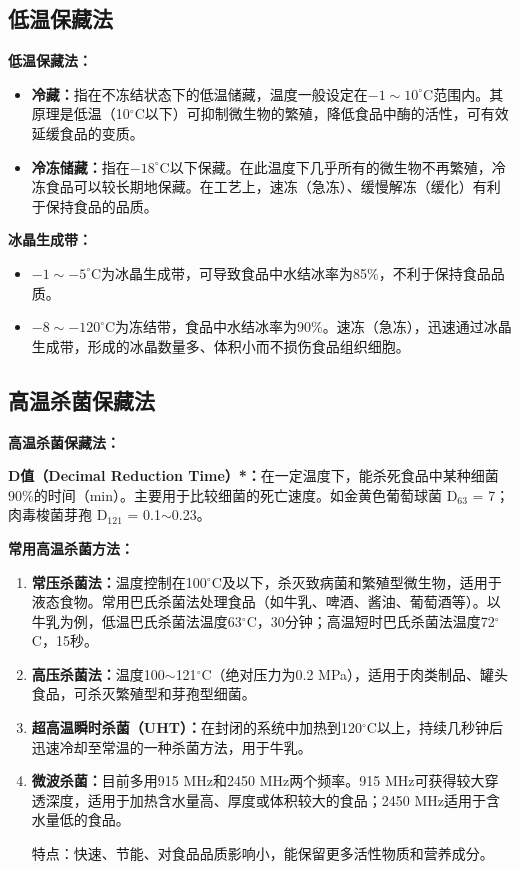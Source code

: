 \subsection{低温保藏法}

\begin{keybox}
\textbf{低温保藏法：}
\begin{itemize}[leftmargin=*]
    \item \textbf{冷藏：}指在不冻结状态下的低温储藏，温度一般设定在$-1\sim10^\circ$C范围内。其原理是低温（10$^\circ$C以下）可抑制微生物的繁殖，降低食品中酶的活性，可有效延缓食品的变质。
    \item \textbf{冷冻储藏：}指在$-18^\circ$C以下保藏。在此温度下几乎所有的微生物不再繁殖，冷冻食品可以较长期地保藏。在工艺上，速冻（急冻）、缓慢解冻（缓化）有利于保持食品的品质。
\end{itemize}

\textbf{冰晶生成带：}
\begin{itemize}[leftmargin=*]
    \item $-1\sim-5^\circ$C为冰晶生成带，可导致食品中水结冰率为85\%，不利于保持食品品质。
    \item $-8\sim-120^\circ$C为冻结带，食品中水结冰率为90\%。速冻（急冻），迅速通过冰晶生成带，形成的冰晶数量多、体积小而不损伤食品组织细胞。
\end{itemize}
\end{keybox}

\subsection{高温杀菌保藏法}

\begin{keybox}
\textbf{高温杀菌保藏法：}

\textbf{D值（Decimal Reduction Time）*\difficulty：}在一定温度下，能杀死食品中某种细菌90\%的时间（min）。主要用于比较细菌的死亡速度。如金黄色葡萄球菌 D$_{63}$ = 7；肉毒梭菌芽孢 D$_{121}$ = 0.1$\sim$0.23。

\textbf{常用高温杀菌方法：}
\begin{enumerate}[leftmargin=*]
    \item \textbf{常压杀菌法：}温度控制在100$^\circ$C及以下，杀灭致病菌和繁殖型微生物，适用于液态食物。常用巴氏杀菌法处理食品（如牛乳、啤酒、酱油、葡萄酒等）。以牛乳为例，低温巴氏杀菌法温度63$^\circ$C，30分钟；高温短时巴氏杀菌法温度72$^\circ$C，15秒。
    \item \textbf{高压杀菌法：}温度100$\sim$121$^\circ$C（绝对压力为0.2 MPa），适用于肉类制品、罐头食品，可杀灭繁殖型和芽孢型细菌。
    \item \textbf{超高温瞬时杀菌（UHT）：}在封闭的系统中加热到120$^\circ$C以上，持续几秒钟后迅速冷却至常温的一种杀菌方法，用于牛乳。
    \item \textbf{微波杀菌：}目前多用915 MHz和2450 MHz两个频率。915 MHz可获得较大穿透深度，适用于加热含水量高、厚度或体积较大的食品；2450 MHz适用于含水量低的食品。

    特点：快速、节能、对食品品质影响小，能保留更多活性物质和营养成分。
\end{enumerate}
\end{keybox}

